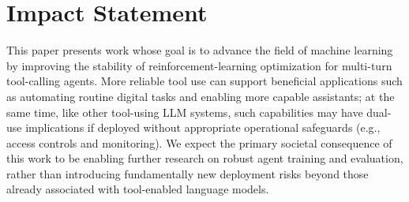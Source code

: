\documentclass{article}
\theoremstyle{plain}
\theoremstyle{definition}
\theoremstyle{remark}
\begin{document}
\section*{Impact Statement}
This paper presents work whose goal is to advance the field of machine learning by improving the stability of reinforcement-learning optimization for multi-turn tool-calling agents. More reliable tool use can support beneficial applications such as automating routine digital tasks and enabling more capable assistants; at the same time, like other tool-using LLM systems, such capabilities may have dual-use implications if deployed without appropriate operational safeguards (e.g., access controls and monitoring). We expect the primary societal consequence of this work to be enabling further research on robust agent training and evaluation, rather than introducing fundamentally new deployment risks beyond those already associated with tool-enabled language models.
\end{document}
